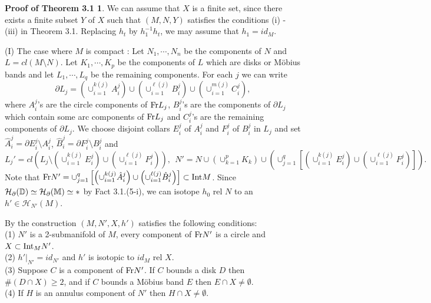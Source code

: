 \documentclass[11pt]{amsart}
\theoremstyle{definition}
\newtheorem*{Proof of Theorem 3.1}{Proof of Theorem 3.1}
\newtheorem*{Proof of Corollary 3.1}{Proof of Corollary 3.1}
\newtheorem*{Proof of Proposition 4.1.(1)}{Proof of Proposition 4.1.(1)}
\newtheorem*{Proof of Proposition 4.1.(2)}{Proof of Proposition 4.1.(2)}
\newtheorem*{Proof of Corollary 1.1}{Proof of Corollary 1.1}
\def \cal {\mathcal}
\begin{document}
\begin{Proof of Theorem 3.1}
We can assume that $X$ is a finite set, since there exists a finite subset $Y$ of $X$ such that $(M, N, Y)$ satisfies the conditions (i) - (iii) in Theorem 3.1. Replacing $h_t$ by $h_1^{-1}h_t$, we may assume that $h_1 = id_M$. 

(I) The case where $M$ is compact : Let $N_1, \cdots, N_n$ be the components of $N$ and $L = cl(M \setminus N)$. Let $K_1, \cdots, K_p$ be the components of $L$ which are disks or M\"obius bands and let $L_1, \cdots, L_q$ be the remaining components. For each $j$ we can write \[ \partial L_j = \left( \cup_{i=1}^{k(j)} A^j_i \right) \cup \left( \cup_{i=1}^{\ell(j)} B^j_i \right) \cup \left( \cup_{i=1}^{m(j)} C^j_i \right), \]
where $A^j_i$'s are the circle components of ${\rm Fr}L_j$, $B^j_i$'s are the components of $\partial L_j$ which contain some arc components of ${\rm Fr}L_j$ and $C^j_i$'s are the remaining components of $\partial L_j$. We choose disjoint collars $E^j_i$ of $A^j_i$ and $F^j_i$ of $B^j_i$ in $L_j$ and set $\hat{A}^j_i = \partial E^j_i \setminus A^j_i$, $\hat{B}^j_i = \partial F^j_i \setminus B^j_i$ and
\[ L_j' = cl(L_j \setminus (\cup_{i=1}^{k(j)} E^j_i) \cup (\cup_{i=1}^{\ell(j)} F^j_i)), \ \ N' = N \cup \left( \cup_{k=1}^p K_k \right) \cup \left( \cup_{j=1}^q \left[ \left( \cup_{i=1}^{k(j)} E^j_i \right) \cup \left( \cup_{i=1}^{\ell(j)} F^j_i \right) \right] \right). \] Note that ${\rm Fr} N' = \cup_{j=1}^q \left[ \left( \cup_{i=1}^{k(j)} \hat{A}^j_i \right) \cup \left( \cup_{i=1}^{\ell(j)} \hat{B}^j_i \right) \right] \subset {\rm Int} M$.
Since ${\cal H}_{\partial}({\Bbb D}) \simeq {\cal H}_{\partial}({\Bbb M}) \simeq \ast$ by Fact 3.1.(5-i), we can isotope $h_0$ rel $N$ to an $h' \in {\cal H}_{N'}(M)$. 

By the construction $(M, N', X, h')$ satisfies the following conditions: \\ 
(1) $N'$ is a 2-submanifold of $M$, every component of ${\rm Fr} N'$ is a circle and $X \subset {\rm Int}_M N'$. \\ 
(2) $h'|_{N'} = id_{N'}$ and $h'$ is isotopic to $id_M$ rel $X$. \\ 
(3) Suppose $C$ is a component of ${\rm Fr} N'$. If $C$ bounds a disk $D$ then $\#(D \cap X) \geq 2$, and if $C$ bounds a M\"obius band $E$ then $E \cap X \neq \emptyset$. \\
(4) If $H$ is an annulus component of $N'$ then $H \cap X \neq \emptyset$. 


\end{Proof of Theorem 3.1}
\end{document}
